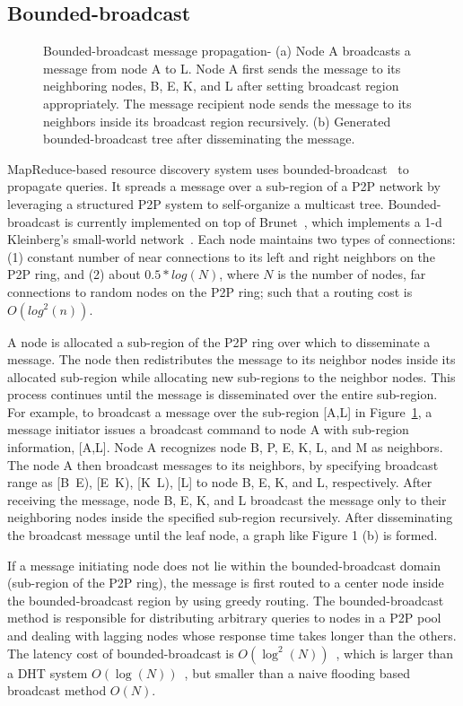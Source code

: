 \documentclass{acm_proc_article-sp}
\begin{document}
\subsection{Bounded-broadcast}
\begin{figure}[t]

\centering
{}
\caption{Bounded-broadcast message propagation- (a) Node A broadcasts a message from node A to L. Node A first sends the message to its neighboring nodes, B, E, K, and L after setting broadcast region appropriately.
The message recipient node sends the message to its neighbors inside its broadcast region recursively. (b) Generated bounded-broadcast tree after disseminating the message.
\label{figure:bb}
}
\end{figure}
MapReduce-based resource discovery system uses bounded-broadcast~\cite{deetoo} to propagate queries. It spreads a message over a sub-region of a P2P network by leveraging a structured P2P system to self-organize a multicast tree. 
Bounded-broadcast is currently implemented on top of Brunet~\cite{brunet}, which implements a 1-d Kleinberg's small-world network~\cite{small_world_network}.
Each node maintains two types of connections: (1) constant number of near connections to its left and right neighbors on the P2P ring, and (2) about $0.5*log(N)$, where $N$ is the number of nodes, far connections to random nodes on the P2P ring; such that a routing cost is $O(log^2(n))$.

A node is allocated a sub-region of the P2P ring over which to disseminate a message. The node then redistributes the message to its neighbor nodes inside its allocated sub-region while allocating new sub-regions to the neighbor nodes. This process continues until the message is disseminated over the entire sub-region. 
For example, to broadcast a message over the sub-region [A,L] in Figure~\ref{figure:bb}, a message initiator issues a broadcast command to node A with sub-region information, [A,L]. 
Node A recognizes node B, P, E, K, L, and M as neighbors.
The node A then broadcast messages to its neighbors, by specifying broadcast range as [B~E), [E~K), [K~L), [L] to node B, E, K, and L, respectively.
After receiving the message, node B, E, K, and L broadcast the message only to their neighboring nodes inside the specified sub-region recursively. 
After disseminating the broadcast message until the leaf node, a graph like Figure 1 (b) is formed.

If a message initiating node does not lie within the bounded-broadcast domain (sub-region of the P2P ring), the message is first routed to a center node inside the bounded-broadcast region by using greedy routing.
The bounded-broadcast method is responsible for distributing arbitrary queries to nodes in a P2P pool and dealing with lagging nodes whose response time takes longer than the others. 
The latency cost of bounded-broadcast is $O(\log^2(N))$~\cite{deetoo}, which is larger than a DHT system $O(\log(N))$~\cite{chord}, but smaller than a naive flooding based broadcast method $O(N)$.
\end{document}
